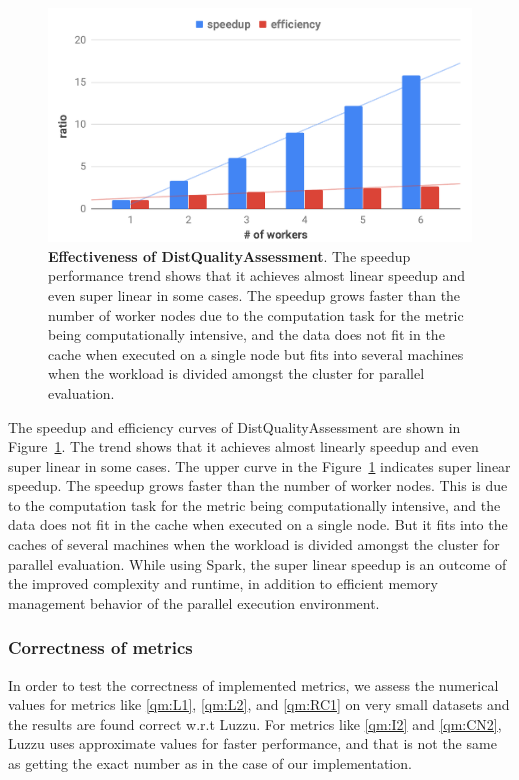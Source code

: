 \begin{figure}
\includegraphics[width=1.0\columnwidth]{images/5_distqualityassessment/distqualityassessment-effectiveness.pdf}
\caption{\textbf{Effectiveness of DistQualityAssessment}.
The speedup performance trend shows that it achieves almost linear speedup and even super linear in some cases.
The speedup grows faster than the number of worker nodes due to the computation task for the metric being computationally intensive, and the data does not fit in the cache when executed on a single node but fits into several machines when the workload is divided amongst the cluster for parallel evaluation.
}
\label{fig:distqualityassessment-effectiveness}
\end{figure}

The speedup and efficiency curves of DistQualityAssessment are shown in Figure~\ref{fig:distqualityassessment-effectiveness}.
The trend shows that it achieves almost linearly speedup and even super linear in some cases.
The upper curve in the Figure~\ref{fig:distqualityassessment-effectiveness} indicates super linear speedup. 
The speedup grows faster than the number of worker nodes.
This is due to the computation task for the metric being computationally intensive, and the data does not fit in the cache when executed on a single node. 
But it fits into the caches of several machines when the workload is divided amongst the cluster for parallel evaluation.
While using Spark, the super linear speedup is an outcome of the improved complexity and runtime, in addition to efficient memory management behavior of the parallel execution environment.

\subsubsection{Correctness of metrics}
In order to test the correctness of implemented metrics, we assess the numerical values for metrics like \ref{qm:L1}, \ref{qm:L2}, and \ref{qm:RC1} on very small datasets and the results are found correct w.r.t Luzzu. 
For metrics like \ref{qm:I2} and \ref{qm:CN2}, Luzzu uses approximate values for faster performance, and that is not the same as getting the exact number as in the case of our implementation.

